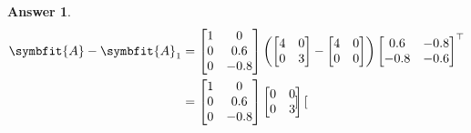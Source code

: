 \documentclass{article}
\theoremstyle{definition}
\newtheorem*{answer}{Answer}
\newcommand{\mat}[1]{\symbfit{#1}}
\begin{document}
\begin{enumerate}[leftmargin=\labelsep]
\begin{enumerate}
\begin{answer}
\begin{align*}
				            \mat{A} - \mat{A}_1       & = \begin{bmatrix}
					                                          1 & 0    \\
					                                          0 & 0.6  \\
					                                          0 & -0.8
				                                          \end{bmatrix} \qty(\begin{bmatrix}
						                                                             4 & 0 \\
						                                                             0 & 3
					                                                             \end{bmatrix} - \begin{bmatrix}
						                                                                             4 & 0 \\
						                                                                             0 & 0
					                                                                             \end{bmatrix})\begin{bmatrix}
					                                                                                           0.6  & -0.8 \\
					                                                                                           -0.8 & -0.6 \\
				                                                                                           \end{bmatrix}^\top \\
				                                      & = \begin{bmatrix}
					                                          1 & 0    \\
					                                          0 & 0.6  \\
					                                          0 & -0.8
				                                          \end{bmatrix}\begin{bmatrix}
					                                                       0 & 0 \\
					                                                       0 & 3
				                                                       \end{bmatrix}\begin{bmatrix}

\end{bmatrix}
\end{align*}
\end{answer}
\end{enumerate}
\end{enumerate}
\end{document}
